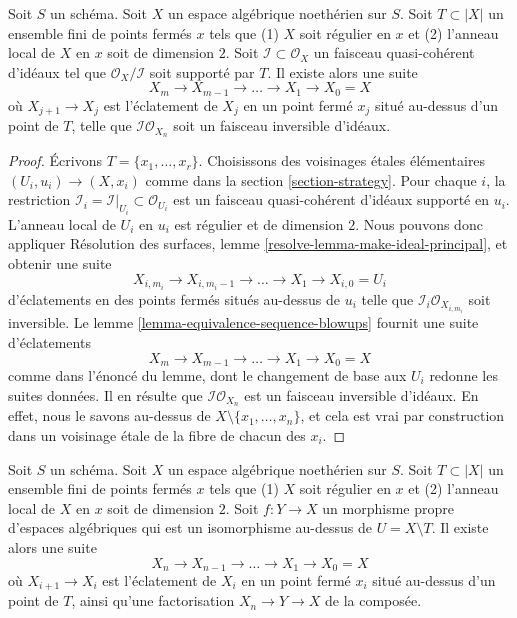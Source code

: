 \begin{lemma}
\label{lemma-make-ideal-principal}
Soit $S$ un schéma. Soit $X$ un espace algébrique noethérien sur $S$.
Soit $T \subset |X|$ un ensemble fini de points fermés $x$ tels que
(1) $X$ soit régulier en $x$ et (2) l'anneau local de $X$ en $x$ soit de
dimension $2$. Soit $\mathcal{I} \subset \mathcal{O}_X$ un faisceau
quasi-cohérent d'idéaux tel que $\mathcal{O}_X/\mathcal{I}$ soit supporté
par $T$. Il existe alors une suite
$$
X_m \to X_{m - 1} \to \ldots \to X_1 \to X_0 = X
$$
où $X_{j + 1} \to X_j$ est l'éclatement de $X_j$ en un point fermé $x_j$
situé au-dessus d'un point de $T$, telle que
$\mathcal{I}\mathcal{O}_{X_n}$ soit un faisceau inversible d'idéaux.
\end{lemma}

\begin{proof}
Écrivons $T = \{x_1, \ldots, x_r\}$. Choisissons des voisinages étales
élémentaires $(U_i, u_i) \to (X, x_i)$ comme dans la section
\ref{section-strategy}. Pour chaque $i$, la restriction
$\mathcal{I}_i = \mathcal{I}|_{U_i} \subset \mathcal{O}_{U_i}$
est un faisceau quasi-cohérent d'idéaux supporté en $u_i$.
L'anneau local de $U_i$ en $u_i$ est régulier et de dimension $2$.
Nous pouvons donc appliquer Résolution des surfaces, lemme
\ref{resolve-lemma-make-ideal-principal}, et obtenir une suite
$$
X_{i, m_i} \to X_{i, m_i - 1} \to \ldots \to X_1 \to X_{i, 0} = U_i
$$
d'éclatements en des points fermés situés au-dessus de $u_i$ telle que
$\mathcal{I}_i \mathcal{O}_{X_{i, m_i}}$ soit inversible.
Le lemme \ref{lemma-equivalence-sequence-blowups} fournit une suite
d'éclatements
$$
X_m \to X_{m - 1} \to \ldots \to X_1 \to X_0 = X
$$
comme dans l'énoncé du lemme, dont le changement de base aux $U_i$ redonne
les suites données. Il en résulte que $\mathcal{I}\mathcal{O}_{X_n}$ est un
faisceau inversible d'idéaux. En effet, nous le savons au-dessus de
$X \setminus \{x_1, \ldots, x_n\}$, et cela est vrai par construction dans
un voisinage étale de la fibre de chacun des $x_i$.
\end{proof}

\begin{lemma}
\label{lemma-dominate-by-blowing-up-in-points}
Soit $S$ un schéma. Soit $X$ un espace algébrique noethérien sur $S$.
Soit $T \subset |X|$ un ensemble fini de points fermés $x$ tels que
(1) $X$ soit régulier en $x$ et (2) l'anneau local de $X$ en $x$ soit de
dimension $2$. Soit $f : Y \to X$ un morphisme propre d'espaces algébriques
qui est un isomorphisme au-dessus de $U = X \setminus T$. Il existe alors
une suite
$$
X_n \to X_{n - 1} \to \ldots \to X_1 \to X_0 = X
$$
où $X_{i + 1} \to X_i$ est l'éclatement de $X_i$ en un point fermé $x_i$
situé au-dessus d'un point de $T$, ainsi qu'une factorisation
$X_n \to Y \to X$ de la composée.
\end{lemma}


